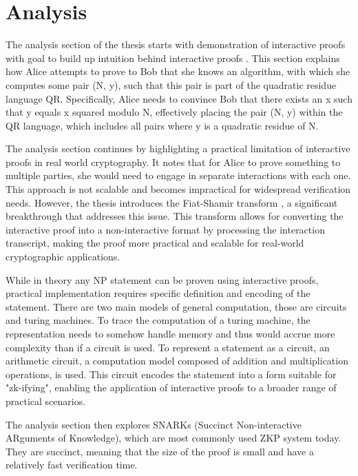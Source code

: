 \chapter{Analysis}

The analysis section of the thesis starts with demonstration of interactive
proofs with goal to build up intuition behind interactive proofs \cite{Goldwasser1989,youtubeMOOCLecture1}.
This section explains how Alice attempts to prove to Bob that she knows an
algorithm, with which she computes some pair (N, y), such that this pair is
part of the quadratic residue language QR. Specifically, Alice needs to
convince Bob that there exists an x such that y equals x squared modulo N,
effectively placing the pair (N, y) within the QR language, which includes all
pairs where y is a quadratic residue of N.

The analysis section continues by highlighting a practical limitation of
interactive proofs in real world cryptography. It notes that for Alice to
prove something to multiple parties, she would need to engage in separate
interactions with each one. This approach is not scalable and becomes
impractical for widespread verification needs. However, the thesis introduces
the Fiat-Shamir transform \cite{Fiat}, a significant breakthrough that addresses this
issue. This transform allows for converting the interactive proof into a
non-interactive format by processing the interaction transcript, making the
proof more practical and scalable for real-world cryptographic applications.

While in theory any NP statement \cite{goldreich1991proofs} can be proven using
interactive proofs, practical implementation requires specific definition and
encoding of the statement. There are two main models of general computation,
those are circuits and turing machines. To trace the computation of a turing
machine, the representation needs to somehow handle memory and thus would accrue
more complexity than if a circuit is used. To represent a statement as a
circuit, an arithmetic circuit, a computation model composed of addition and
multiplication operations, is used. This circuit encodes the statement into a
form suitable for "zk-ifying", enabling the application of interactive proofs
to a broader range of practical scenarios.

The analysis section then explores SNARKs (Succinct Non-interactive ARguments
of Knowledge), which are most commonly used ZKP system today. They are succinct,
meaning that the size of the proof is small and have a relatively fast verification
time.


